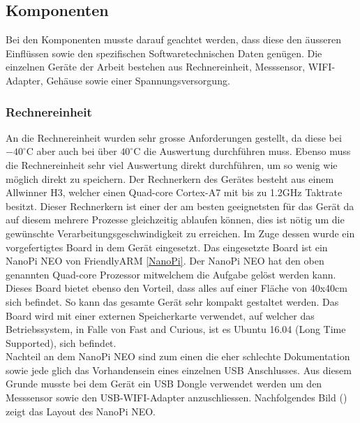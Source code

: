\subsection{Komponenten}
Bei den Komponenten musste darauf geachtet werden, dass diese den äusseren Einflüssen sowie den spezifischen Softwaretechnischen Daten genügen. Die einzelnen Geräte der Arbeit bestehen aus Rechnereinheit, Messsensor, WIFI-Adapter, Gehäuse sowie einer Spannungsversorgung.

\subsubsection{Rechnereinheit}
An die Rechnereinheit wurden sehr grosse Anforderungen gestellt, da diese bei $-40^\circ\text{C}$ aber auch bei über $40^\circ\text{C}$ die Auswertung durchführen muss. Ebenso muss die Rechnereinheit sehr viel Auswertung direkt durchführen, um so wenig wie möglich direkt zu speichern. Der Rechnerkern des Gerätes besteht aus einem Allwinner H3, welcher einen Quad-core Cortex-A7 mit bis zu 1.2GHz Taktrate besitzt. Dieser Rechnerkern ist einer der am besten geeignetsten für das Gerät da auf diesem mehrere Prozesse gleichzeitig ablaufen können, dies ist nötig um die gewünschte Verarbeitungsgeschwindigkeit zu erreichen. Im Zuge dessen wurde ein vorgefertigtes Board in dem Gerät eingesetzt. Das eingesetzte Board ist ein NanoPi NEO von FriendlyARM \ref{NanoPi}. Der NanoPi NEO hat den oben genannten Quad-core Prozessor mitwelchem die Aufgabe gelöst werden kann. \\
Dieses Board bietet ebenso den Vorteil, dass alles auf einer Fläche von 40x40cm sich befindet. So kann das gesamte Gerät sehr kompakt gestaltet werden. Das Board wird mit einer externen Speicherkarte verwendet, auf welcher das Betriebssystem, in Falle von Fast and Curious, ist es Ubuntu 16.04 (Long Time Supported), sich befindet. \\
Nachteil an dem NanoPi NEO sind zum einen die eher schlechte Dokumentation sowie jede glich das Vorhandensein eines einzelnen USB Anschlusses. Aus diesem Grunde musste bei dem Gerät ein USB Dongle verwendet werden um den Messsensor sowie den USB-WIFI-Adapter anzuschliessen. Nachfolgendes Bild () zeigt das Layout des NanoPi NEO.

